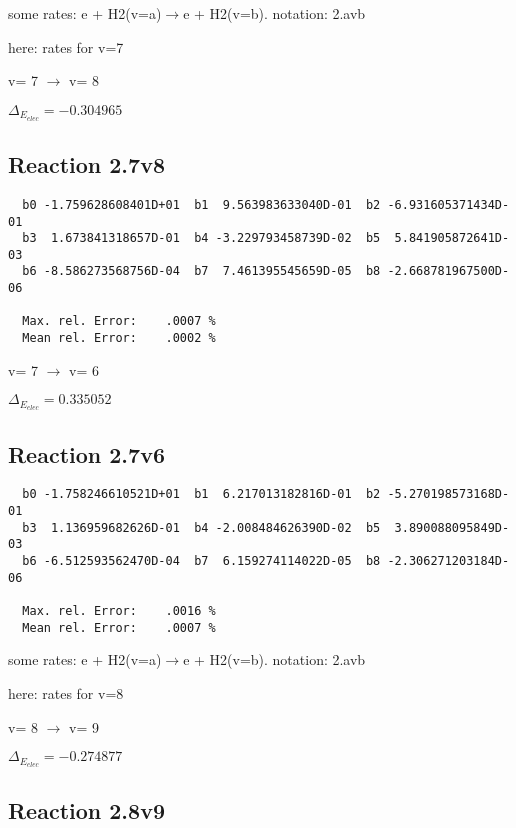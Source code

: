 \documentclass[12pt]{article}
\begin{document}
\newpage
some rates: e + H2(v=a)$\rightarrow$e + H2(v=b). notation: 2.avb

here: rates for v=7

  v=  7 $\rightarrow$ v= 8

$\Delta_{E_{elec}}=-0.304965$


\subsection{
Reaction 2.7v8
}


\begin{small}\begin{verbatim}
  b0 -1.759628608401D+01  b1  9.563983633040D-01  b2 -6.931605371434D-01
  b3  1.673841318657D-01  b4 -3.229793458739D-02  b5  5.841905872641D-03
  b6 -8.586273568756D-04  b7  7.461395545659D-05  b8 -2.668781967500D-06

  Max. rel. Error:    .0007 %
  Mean rel. Error:    .0002 %

\end{verbatim}\end{small}

  v=  7 $\rightarrow$ v= 6

$\Delta_{E_{elec}}= 0.335052$


\subsection{
Reaction 2.7v6
}


\begin{small}\begin{verbatim}
  b0 -1.758246610521D+01  b1  6.217013182816D-01  b2 -5.270198573168D-01
  b3  1.136959682626D-01  b4 -2.008484626390D-02  b5  3.890088095849D-03
  b6 -6.512593562470D-04  b7  6.159274114022D-05  b8 -2.306271203184D-06

  Max. rel. Error:    .0016 %
  Mean rel. Error:    .0007 %

\end{verbatim}\end{small}
\newpage
some rates: e + H2(v=a)$\rightarrow$e + H2(v=b). notation: 2.avb

here: rates for v=8


  v=  8 $\rightarrow$ v= 9

$\Delta_{E_{elec}}=-0.274877$


\subsection{
Reaction 2.8v9
}
\end{document}
